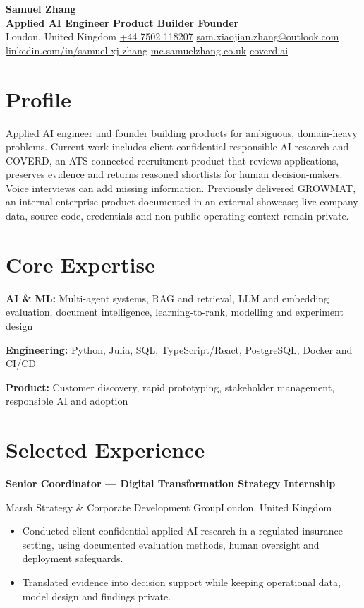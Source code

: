 \documentclass[11pt,a4paper]{extarticle}
\newcommand{\cvdate}[1]{{\normalfont\normalsize\bfseries #1}}
\newcommand{\primaryrole}[4]{%
  \textbf{#1}\par\vspace{-1pt}
  {\small\color{muted}#2\enspace\textbullet\enspace #4\hfill\color{ink}\cvdate{#3}\par}\vspace{-1pt}
}
\begin{document}
\begin{center}
  {\huge\bfseries Samuel Zhang}\\[2pt]
  {\large\bfseries Applied AI Engineer \textperiodcentered{} Product Builder \textperiodcentered{} Founder}\\[4pt]
  \small
  London, United Kingdom \enspace\textbullet\enspace
  \href{tel:+447502118207}{+44 7502 118207} \enspace\textbullet\enspace
  \href{mailto:sam.xiaojian.zhang@outlook.com}{sam.xiaojian.zhang@outlook.com}\\[-1pt]
  \href{https://www.linkedin.com/in/samuel-xj-zhang/}{linkedin.com/in/samuel-xj-zhang}
  \enspace\textbullet\enspace
  \href{https://me.samuelzhang.co.uk}{me.samuelzhang.co.uk}
  \enspace\textbullet\enspace
  \href{https://coverd.ai}{coverd.ai}
\end{center}

\section{Profile}
Applied AI engineer and founder building products for ambiguous, domain-heavy problems. Current work includes client-confidential responsible AI research and COVERD, an ATS-connected recruitment product that reviews applications, preserves evidence and returns reasoned shortlists for human decision-makers. Voice interviews can add missing information. Previously delivered GROWMAT, an internal enterprise product documented in an external showcase; live company data, source code, credentials and non-public operating context remain private.

\section{Core Expertise}
\textbf{AI \& ML:} Multi-agent systems, RAG and retrieval, LLM and embedding evaluation, document intelligence, learning-to-rank, modelling and experiment design

\textbf{Engineering:} Python, Julia, SQL, TypeScript/React, PostgreSQL, Docker and CI/CD

\textbf{Product:} Customer discovery, rapid prototyping, stakeholder management, responsible AI and adoption


\section{Selected Experience}

\primaryrole{Senior Coordinator --- Digital Transformation Strategy Internship}{Marsh \textperiodcentered{} Strategy \& Corporate Development Group}{May 2026 -- Present}{London, United Kingdom}
\begin{itemize}
  \item Conducted client-confidential applied-AI research in a regulated insurance setting, using documented evaluation methods, human oversight and deployment safeguards.
  \item Translated evidence into decision support while keeping operational data, model design and findings private.
\end{itemize}
\end{document}
